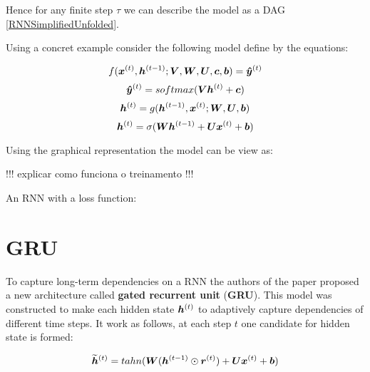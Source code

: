 Hence for any finite step $\tau$ we can describe the model as a DAG \ref{RNNSimplifiedUnfolded}.



Using a concret example consider the following model define by the equations:

\begin{equation}
f(\bm{x}^{(t)}, \bm{h}^{(t-1)}; \bm{V}, \bm{W}, \bm{U}, \bm{c}, \bm{b}) = \bm{\hat{y}}^{(t)}
\end{equation}
 \vspace{0.2cm}
\begin{equation}
\bm{\hat{y}}^{(t)} = softmax(\bm{V} \bm{h}^{(t)} + \bm{c})
\end{equation}
\vspace{0.2cm}
 \begin{equation}
\bm{h}^{(t)} = g(\bm{h}^{(t-1)}, \bm{x}^{(t)}; \bm{W},\bm{U}, \bm{b})
\end{equation}
\vspace{0.2cm}
\begin{equation}
\bm{h}^{(t)} = \sigma(\bm{W} \bm{h}^{(t-1)} + \bm{U} \bm{x}^{(t)} + \bm{b})
\end{equation}

Using the graphical representation the model can be view as:

 

!!! explicar como funciona o treinamento !!!

An RNN with a loss function:




\section{GRU}
\label{sec:GRU}


To capture long-term dependencies on a RNN  the authors of the paper \cite{ChungGCB14}  proposed a new architecture called \textbf{gated recurrent unit} (\textbf{GRU}). This model was constructed to make each hidden state  $\bm{h}^{(t)}$ to adaptively capture dependencies of different time steps. It work as follows, at each step $t$ one candidate for hidden state is formed:

\begin{equation}
\bm{\widetilde{h}}^{(t)} = tahn(\bm{W} (\bm{h}^{(t-1)} \odot  \bm{r}^{(t)}) + \bm{U} \bm{x}^{(t)} + \bm{b})
\end{equation}


